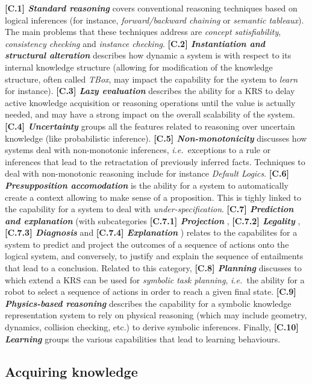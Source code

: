 \documentclass[journal]{IEEEtran}
\newcommand{\ie}{{\textit{i.e.\ }}}
\newcommand{\taxon}[2]{%
    \textbf{[#1] \emph{#2}}
}
\begin{document}
\taxon{C.1}{Standard reasoning} covers conventional reasoning techniques based
on logical inferences (for instance, \emph{forward/backward chaining} or
\emph{semantic tableaux}). The main problems that these techniques address are
\emph{concept satisfiability}, \emph{consistency checking} and \emph{instance
checking}. \taxon{C.2}{Instantiation and structural alteration} describes how
dynamic a system is with respect to its internal knowledge structure (allowing
for modification of the knowledge structure, often called \emph{TBox}, may
impact the capability for the system to \emph{learn} for instance).
\taxon{C.3}{Lazy evaluation} describes the ability for a KRS to delay active
knowledge acquisition or reasoning operations until the value is actually
needed, and may have a strong impact on the overall scalability of the system.
\taxon{C.4}{Uncertainty} groups all the features related to reasoning over
uncertain knowledge (like probabilistic inference).
\taxon{C.5}{Non-monotonicity} discusses how systems deal with non-monotonic
inferences, \ie exceptions to a rule or inferences that lead to the retractation
of previously inferred facts. Techniques to deal with non-monotonic reasoning
include for instance \emph{Default Logics}.  \taxon{C.6}{Presupposition
accomodation} is the ability for a system to automatically create a context
allowing to make sense of a proposition. This is tighly linked to the capability
for a system to deal with \emph{under-specification}. \taxon{C.7}{Prediction and
explanation} (with subcategories \taxon{C.7.1}{Projection},
\taxon{C.7.2}{Legality}, \taxon{C.7.3}{Diagnosis} and
\taxon{C.7.4}{Explanation}) relates to the capabilites for a system to predict
and project the outcomes of a sequence of actions onto the logical system, and
conversely, to justify and explain the sequence of entailments that lead to a
conclusion. Related to this category, \taxon{C.8}{Planning} discusses to which
extend a KRS can be used for \emph{symbolic task planning}, \ie the ability for
a robot to select a sequence of actions in order to reach a given final state.
\taxon{C.9}{Physics-based reasoning} describes the capability for a symbolic
knowledge representation system to rely on physical reasoning (which may include
geometry, dynamics, collision checking, etc.) to derive symbolic inferences.
Finally, \taxon{C.10}{Learning} groups the various capabilities that lead to
learning behaviours.

\subsection{Acquiring knowledge}
\end{document}
